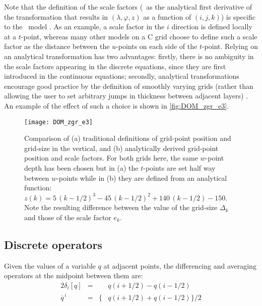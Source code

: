 \documentclass[../main/NEMO_manual]{subfiles}
\begin{document}
Note that the definition of the scale factors
(\ie\ as the analytical first derivative of the transformation that
results in $(\lambda,\varphi,z)$ as a function of $(i,j,k)$)
is specific to the \NEMO\ model \citep{marti.madec.ea_JGR92}.
As an example, a scale factor in the $i$ direction is defined locally at a $t$-point,
whereas many other models on a C grid choose to define such a scale factor as
the distance between the $u$-points on each side of the $t$-point.
Relying on an analytical transformation has two advantages:
firstly, there is no ambiguity in the scale factors appearing in the discrete equations,
since they are first introduced in the continuous equations;
secondly, analytical transformations encourage good practice by
the definition of smoothly varying grids
(rather than allowing the user to set arbitrary jumps in thickness between adjacent layers)
\citep{treguier.dukowicz.ea_JGR96}.
An example of the effect of such a choice is shown in \autoref{fig:DOM_zgr_e3}.
\begin{figure}
  \centering
  \texttt{[image: DOM\_zgr\_e3]}
  \caption[Comparison of grid-point position, vertical grid-size and scale factors]{
    Comparison of (a) traditional definitions of grid-point position and grid-size in the vertical,
    and (b) analytically derived grid-point position and scale factors.
    For both grids here, the same $w$-point depth has been chosen but
    in (a) the $t$-points are set half way between $w$-points while
    in (b) they are defined from an analytical function:
    $z(k) = 5 \, (k - 1/2)^3 - 45 \, (k - 1/2)^2 + 140 \, (k - 1/2) - 150$.
    Note the resulting difference between the value of the grid-size $\Delta_k$ and
    those of the scale factor $e_k$.}
  \label{fig:DOM_zgr_e3}
\end{figure}

\subsection{Discrete operators}
\label{subsec:DOM_operators}

Given the values of a variable $q$ at adjacent points,
the differencing and averaging operators at the midpoint between them are:
\begin{alignat*}{2}
  \delta_i [q]      &= &       &q (i + 1/2) - q (i - 1/2) \\
  \overline q^{\, i} &= &\big\{ &q (i + 1/2) + q (i - 1/2) \big\} / 2
\end{alignat*}
\end{document}
